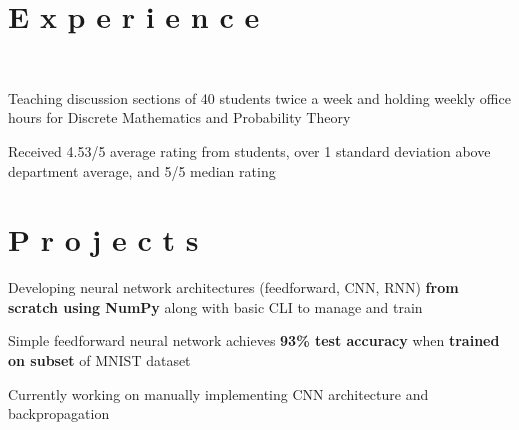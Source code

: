 \documentclass[]{deedy-resume-openfont}
\begin{document}
\begin{minipage}[t]{0.66\textwidth} 


\section{E x p e r i e n c e}
\vspace{4pt}
 \\
\vspace{\topsep} %
\beforetightemize{} %
\begin{tightemize}
\item Teaching discussion sections of 40 students twice a week and holding weekly office hours for Discrete Mathematics and Probability Theory
\item Received 4.53/5 average rating from students, over 1 standard deviation above department average, and 5/5 median rating
\end{tightemize}
\vspace{4pt}


\section{P r o j e c t s}
\vspace{4pt}
\begin{tightemize}
\item Developing neural network architectures (feedforward, CNN, RNN) \textbf{from scratch using NumPy} along with basic CLI to manage and train
\item Simple feedforward neural network achieves \textbf{93\% test accuracy} when \textbf{trained on subset} of MNIST dataset
\item Currently working on manually implementing CNN architecture and backpropagation
\end{tightemize}
\sectionsep


\end{minipage}
\end{document}
